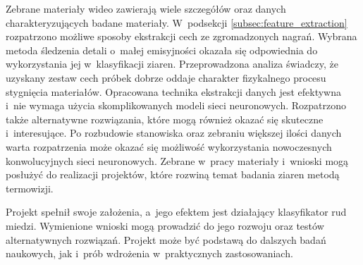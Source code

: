 Zebrane materiały wideo zawierają wiele szczegółów oraz danych
charakteryzujących badane materiały.
W~podsekcji \ref{subsec:feature_extraction} rozpatrzono możliwe sposoby
ekstrakcji cech ze zgromadzonych nagrań.
Wybrana metoda śledzenia detali o~małej emisyjności okazała się odpowiednia
do wykorzystania jej w~klasyfikacji ziaren.
Przeprowadzona analiza świadczy, że uzyskany zestaw cech próbek dobrze
oddaje charakter fizykalnego procesu stygnięcia materiałów.
Opracowana technika ekstrakcji danych jest efektywna i~nie wymaga użycia
skomplikowanych modeli sieci neuronowych.
Rozpatrzono także alternatywne rozwiązania, które mogą również okazać się
skuteczne i~interesujące.
Po rozbudowie stanowiska oraz zebraniu większej ilości danych warta
rozpatrzenia może okazać się możliwość wykorzystania nowoczesnych
konwolucyjnych sieci neuronowych.
Zebrane w~pracy materiały i~wnioski mogą posłużyć do realizacji projektów,
które rozwiną temat badania ziaren metodą termowizji.

Projekt spełnił swoje założenia, a~jego efektem jest działający klasyfikator
rud miedzi.
Wymienione wnioski mogą prowadzić do jego rozwoju oraz testów alternatywnych
rozwiązań.
Projekt może być podstawą do dalszych badań naukowych, jak i~prób wdrożenia
w~praktycznych zastosowaniach.
